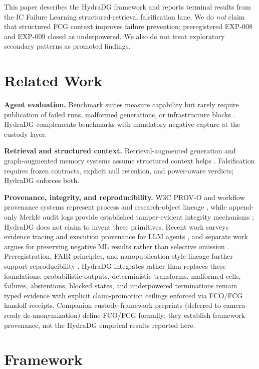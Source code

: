 \documentclass{article}
\begin{document}
This paper describes the HydraDG framework and reports terminal results from the IC Failure Learning structured-retrieval falsification lane.
We do \emph{not} claim that structured FCG context improves failure prevention; preregistered EXP-008 and EXP-009 closed as underpowered.
We also do not treat exploratory secondary patterns as promoted findings.

\section{Related Work}

\textbf{Agent evaluation.} Benchmark suites measure capability but rarely require publication of failed runs, malformed generations, or infrastructure blocks \cite{liu2023agentbench,zhou2023webarena}.
HydraDG complements benchmarks with mandatory negative capture at the custody layer.

\textbf{Retrieval and structured context.} Retrieval-augmented generation and graph-augmented memory systems assume structured context helps \cite{lewis2020rag,edge2024graphrag}.
Falsification requires frozen contracts, explicit null retention, and power-aware verdicts; HydraDG enforces both.

\textbf{Provenance, integrity, and reproducibility.}
W3C PROV-O and workflow provenance systems represent process and research-object lineage \cite{lebo2013provo,khan2019cwlprov}, while append-only Merkle audit logs provide established tamper-evident integrity mechanisms \cite{laurie2013ct}; HydraDG does not claim to invent these primitives.
Recent work surveys evidence tracing and execution provenance for LLM agents \cite{wang2026agentprovenance}, and separate work argues for preserving negative ML results rather than selective omission \cite{karl2024negative}.
Preregistration, FAIR principles, and nanopublication-style lineage further support reproducibility \cite{nosek2018prereg,wilkinson2016fair,groth2010nano}.
HydraDG integrates rather than replaces these foundations: probabilistic outputs, deterministic transforms, malformed cells, failures, abstentions, blocked states, and underpowered terminations remain typed evidence with explicit claim-promotion ceilings enforced via FCO/FCG handoff receipts.
Companion custody-framework preprints (deferred to camera-ready de-anonymization) define FCO/FCG formally; they establish framework provenance, not the HydraDG empirical results reported here.

\section{Framework}
\end{document}
